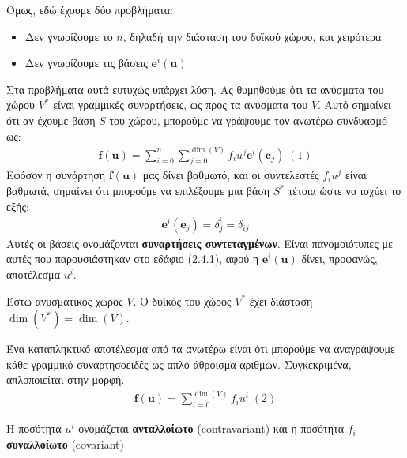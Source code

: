 \documentclass[main.tex]{subfiles}
\begin{document}
	Όμως, εδώ έχουμε δύο προβλήματα:
	\begin{itemize}
		\item Δεν γνωρίζουμε το $n$, δηλαδή την διάσταση του δυϊκού χώρου, και χειρότερα
		\item Δεν γνωρίζουμε τις βάσεις $\boldsymbol{e}^i(\boldsymbol{u})$
	\end{itemize}
	Στα προβλήματα αυτά ευτυχώς υπάρχει λύση. Ας θυμηθούμε ότι τα ανύσματα του χώρου $V^*$ είναι γραμμικές συναρτήσεις, ως προς τα ανύσματα του $V$. Αυτό σημαίνει ότι αν έχουμε βάση $S$ του χώρου, μπορούμε να γράψουμε τον ανωτέρω συνδυασμό ως:
	\begin{align*}
		\boldsymbol{f}(\boldsymbol{u}) = \sum_{i=0}^{n}\sum_{j=0}^{\dim(V)}f_iu^j\boldsymbol{e}^i(\boldsymbol{e}_j) \; (1)
	\end{align*}
	Εφόσον η συνάρτηση $\boldsymbol{f}(\boldsymbol{u})$ μας δίνει βαθμωτό, και οι συντελεστές $f_iu^j$ είναι βαθμωτά, σημαίνει ότι μπορούμε να επιλέξουμε μια βάση $S^*$ τέτοια ώστε να ισχύει το εξής:
	\begin{align*}
		\boldsymbol{e}^i(\boldsymbol{e}_j) = \delta^i_{j} = \delta_{ij}
	\end{align*}
	Αυτές οι βάσεις ονομάζονται \textbf{συναρτήσεις συντεταγμένων}. Είναι πανομοιότυπες με αυτές που παρουσιάστηκαν στο εδάφιο (2.4.1), αφού η $\boldsymbol{e}^i(\boldsymbol{u})$ δίνει, προφανώς, αποτέλεσμα $u^i$.
	
	\begin{corollary}
		Έστω ανυσματικός χώρος $V$. Ο δυϊκός του χώρος $V^*$ έχει διάσταση ${\dim(V^*) = \dim(V)}$.
	\end{corollary}

	Ένα καταπληκτικό αποτέλεσμα από τα ανωτέρω είναι ότι μπορούμε να αναγράψουμε κάθε γραμμικό συναρτησοειδές ως απλό άθροισμα αριθμών. Συγκεκριμένα, απλοποιείται στην μορφή.
	\begin{align*}
		\boldsymbol{f}(\boldsymbol{u}) = \sum_{i=0}^{\dim(V)}f_iu^i \; (2)
	\end{align*}
	\begin{definition}
		Η ποσότητα $u^i$ ονομάζεται \textbf{ανταλλοίωτο} (contravariant) και η ποσότητα $f_i$ \textbf{συναλλοίωτο} (covariant) 
	\end{definition}
\end{document}
